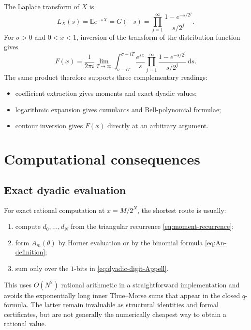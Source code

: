 \documentclass[11pt,oneside]{article}
\theoremstyle{definition}
\theoremstyle{remark}
\newcommand{\E}{\mathbb E}
\newcommand{\dd}{\,\mathrm d}
\begin{document}
The Laplace transform of $X$ is
\begin{equation}\label{eq:LX}
 L_X(s)=\E e^{-sX}=G(-s)
 =\prod_{j=1}^{\infty}
 \frac{1-e^{-s/2^j}}{s/2^j}.
\end{equation}
For $\sigma>0$ and $0<x<1$, inversion of the transform of the distribution
function gives
\begin{equation}\label{eq:Bromwich}
 \boxed{
 F(x)=\frac1{2\pi i}
 \lim_{T\to\infty}
 \int_{\sigma-iT}^{\sigma+iT}
 \frac{e^{sx}}{s}
 \prod_{j=1}^{\infty}
 \frac{1-e^{-s/2^j}}{s/2^j}\dd s.}
\end{equation}
The same product therefore supports three complementary readings:
\begin{itemize}
\item coefficient extraction gives moments and exact dyadic values;
\item logarithmic expansion gives cumulants and Bell-polynomial formulae;
\item contour inversion gives $F(x)$ directly at an arbitrary argument.
\end{itemize}

\section{Computational consequences}

\subsection{Exact dyadic evaluation}

For exact rational computation at $x=M/2^N$, the shortest route is usually:

\begin{enumerate}
\item compute $d_0,\ldots,d_N$ from the triangular recurrence
  \eqref{eq:moment-recurrence};
\item form $A_m(\theta)$ by Horner evaluation or by the binomial formula
  \eqref{eq:An-definition};
\item sum only over the $1$-bits in \eqref{eq:dyadic-digit-Appell}.
\end{enumerate}

This uses $O(N^2)$ rational arithmetic in a straightforward implementation and
avoids the exponentially long inner Thue--Morse sums that appear in the
closed $q$-formula.  The latter remain invaluable as structural identities and
formal certificates, but are not generally the numerically cheapest way to
obtain a rational value.
\end{document}
